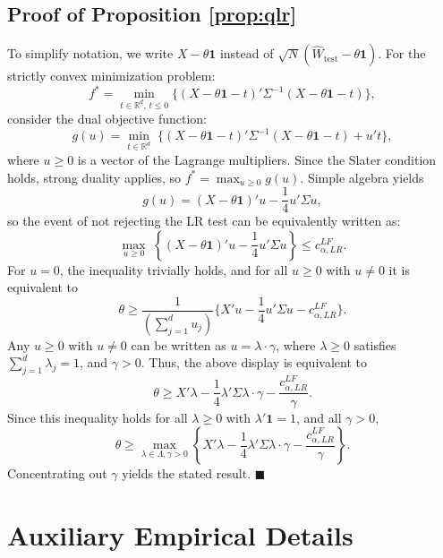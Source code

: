 \documentclass[12pt]{article}
\numberwithin{equation}{section}
\theoremstyle{plain}                         %
\theoremstyle{definition}                  %
\theoremstyle{remark}                      %
\renewcommand{\qed}{\hfill$\blacksquare$}
\begin{document}
\subsection{Proof of Proposition \ref{prop:qlr}}
To simplify notation, we write $X - \theta \bm{1}$ instead of $\sqrt{N}(\widehat{W}_{\text{test}} - \theta \bm{1})$. For the strictly convex minimization problem:
	\[
	f^* = \min \limits_{t \in \mathbb{R}^d,\, t \leq 0} \{ (X - \theta \bm{1} - t)'\Sigma^{-1}(X - \theta \bm{1} - t) \},
	\]
	consider the dual objective function:
	\[
	g(u) = \min\limits_{t \in \mathbb{R}^d}\;\{ (X - \theta \bm{1} - t)'\Sigma^{-1}(X - \theta \bm{1} - t) + u't\},
	\]
	where \(u \geqslant 0\) is a vector of the Lagrange multipliers. Since the Slater condition holds, strong duality applies, so \(f^* = \max_{u \geqslant 0} g(u)\). Simple algebra yields
	\[
	g(u) = (X - \theta \bm{1})'u - \frac{1}{4}u'\Sigma u,
	\]
	so the event of not rejecting the LR test can be equivalently written as:
	\[
	\max \limits_{u \geqslant 0} \; \left\{ (X - \theta \bm{1})'u - \frac{1}{4}u'\Sigma u \right\} \leq c_{\alpha, LR}^{LF}.
	\]	
	For \(u = 0\), the inequality trivially holds, and for all \(u \geqslant 0\) with \(u \ne 0\) it is equivalent to
	\[
	\theta  \geqslant \frac{1}{(\sum_{j = 1}^d u_j)} \{ X'u - \frac{1}{4}u'\Sigma u - c_{\alpha, LR}^{LF} \}.
 	\]
 	Any $u \geqslant 0$ with $u \ne 0$ can be written as $u = \lambda \cdot \gamma$, where $\lambda \geqslant 0$ satisfies $\sum_{j = 1}^d \lambda_j = 1$, and $\gamma > 0$. Thus, the above display is equivalent to
	\[
	\theta \geqslant X'\lambda - \frac{1}{4}\lambda'\Sigma \lambda \cdot \gamma - \frac{c_{\alpha, LR}^{LF}}{\gamma}.
	\]
	Since this inequality holds for all \(\lambda \geqslant 0\) with \(\lambda'\bm{1} = 1\), and all \(\gamma > 0\), 
	\[
	\theta \geqslant \max \limits_{\lambda \in \Lambda, \gamma > 0} \left\{ X'\lambda - \frac{1}{4}\lambda'\Sigma \lambda \cdot \gamma - \frac{c_{\alpha, LR}^{LF}}{\gamma}\right\}.
	\]
	Concentrating out \(\gamma\) yields the stated result. \qed 
	


\section{Auxiliary Empirical Details}
\label{app:emp}



\end{document}
